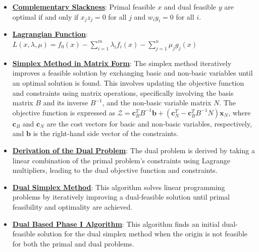 \documentclass{article}%
\begin{document}
\begin{itemize}[leftmargin=*]
\item \href{https://www.math.purdue.edu/~yipn/421/2024-09-12-Duality.pdf#page=21}{\textbf{Complementary Slackness}}: Primal feasible $x$ and dual feasible $y$ are optimal if and only if $x_j z_j = 0$ for all $j$ and $w_i y_i = 0$ for all $i$.%
\item \href{https://www.math.purdue.edu/~yipn/421/2024-09-17-DualityGeneral.pdf#page=7}{\textbf{Lagrangian Function}}: $L(x,\lambda,\mu) = f_0(x) - \sum_{i=1}^m \lambda_i f_i(x) - \sum_{j=1}^n \mu_j g_j(x)$%
\item \href{https://www.math.purdue.edu/~yipn/421/2024-09-24-SimplexMatrix.pdf#page=8}{\textbf{Simplex Method in Matrix Form}}: The simplex method iteratively improves a feasible solution by exchanging basic and non-basic variables until an optimal solution is found. This involves updating the objective function and constraints using matrix operations, specifically involving the basis matrix $B$ and its inverse $B^{-1}$, and the non-basic variable matrix $N$. The objective function is expressed as $\mathcal{Z} = \mathbf{c}_B^T B^{-1} \mathbf{b} + (\mathbf{c}_N^T - \mathbf{c}_B^T B^{-1} N) \mathbf{x}_N$, where $\mathbf{c}_B$ and $\mathbf{c}_N$ are the cost vectors for basic and non-basic variables, respectively, and $\mathbf{b}$ is the right-hand side vector of the constraints.%
\item \href{https://www.math.purdue.edu/~yipn/421/2024-10-01-DualGeneralLP.pdf#page=1}{\textbf{Derivation of the Dual Problem}}: The dual problem is derived by taking a linear combination of the primal problem's constraints using Lagrange multipliers, leading to the dual objective function and constraints.%
\item \href{https://www.math.purdue.edu/~yipn/421/2024-10-03-DualSimplexMatrix.pdf#page=2}{\textbf{Dual Simplex Method}}: This algorithm solves linear programming problems by iteratively improving a dual-feasible solution until primal feasibility and optimality are achieved.%
\item \href{https://www.math.purdue.edu/~yipn/421/2024-10-03-DualSimplexMatrix.pdf#page=5}{\textbf{Dual Based Phase I Algorithm}}: This algorithm finds an initial dual-feasible solution for the dual simplex method when the origin is not feasible for both the primal and dual problems.%
\end{itemize}

%
\end{document}
